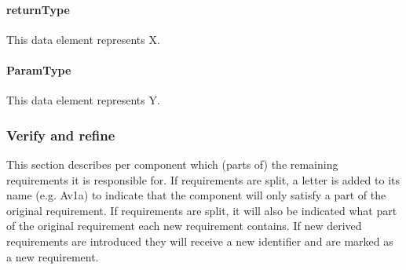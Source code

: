 \documentclass[a4paper,10pt]{article}
\begin{document}
\paragraph{returnType} This data element represents X.

\paragraph{ParamType} This data element represents Y.

\subsubsection{Verify and refine}
This section describes per component which (parts of) the remaining requirements it is responsible for. If requirements are split, a letter is added to its name (e.g. Av1a) to indicate that the component will only satisfy a part of the original requirement. If requirements are split, it will also be indicated what part of the original requirement each new requirement contains. If new derived requirements are introduced they will receive a new identifier and are marked as a new requirement.
\end{document}
